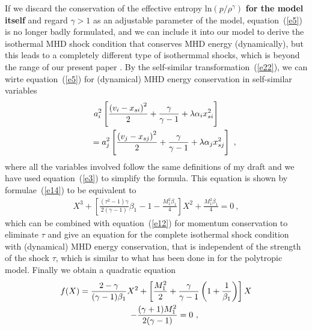 \documentclass[fleqn,usenatbib]{mnras}
\begin{document}
If we discard the conservation of the effective entropy $\mathrm{ln}\left(p/\rho^{\gamma}\right)$ \textbf{for the model itself} and regard $\gamma>1$ as an adjustable parameter of the model, equation~(\ref{e5}) is no longer badly formulated, and we can include it into our model to derive the isothermal MHD shock condition that conserves MHD energy (dynamically), but this leads to a completely different type of isothermmal shocks, which is beyond the range of our present paper
. By the self-similar transformation~(\ref{e22}), we can wirte equation~(\ref{e5}) for (dynamical) MHD energy conservation in self-similar variables
\begin{gather}
a_{i}^{2}\left[\frac{\left(v_{i}-x_{si}\right)^{2}}{2}+\frac{\gamma}{\gamma-1}+\lambda\alpha_{i}x_{si}^{2}\right]\notag\\
\qquad =a_{j}^{2}\left[\frac{\left(v_{j}-x_{sj}\right)^{2}}{2}+\frac{\gamma}{\gamma-1}+\lambda\alpha_{j}x_{sj}^{2}\right]\ ,\label{e23}
\end{gather}
where all the variables involved follow the same definitions of my draft and we have used equation~(\ref{e3}) to simplify the formula. This equation is shown by formulae~(\ref{e14}) to be equivalent to
\begin{gather}
X^{3}+\left[\frac{\left(\tau^{2}-1\right)\gamma}{2(\gamma-1)}\beta_{1}-1-\frac{M_{1}^{2}\beta_{1}}{4}\right]X^{2}+\frac{M_{1}^{2}\beta_{1}}{4}=0\ ,\label{e24}
\end{gather}
which can be combined with equation~(\ref{e12}) for momentum conservation to eliminate $\tau$ and give an equation for the complete isothermal shock condition with (dynamical) MHD energy conservation, that is independent of the strength of the shock $\tau$, which is similar to what has been done in \citet{wang2008dynamic} for the polytropic model. Finally we obtain a quadratic equation
\begin{gather}
f(X)=\frac{2-\gamma}{(\gamma-1)\beta_{1}}X^{2}+\left[\frac{M_{1}^{2}}{2}+\frac{\gamma}{\gamma-1}\left(1+\frac{1}{\beta_{1}}\right)\right]X\notag\\
\qquad -\frac{(\gamma+1)M_{1}^{2}}{2(\gamma-1)}=0\ ,\label{e25}
\end{gather}
\end{document}

